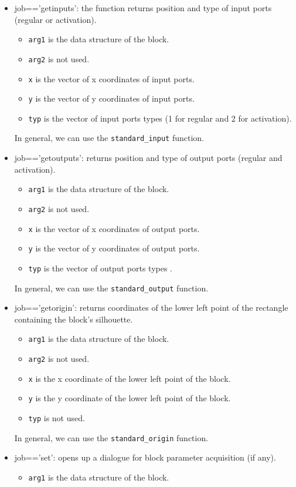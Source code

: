 \documentclass{article}
\begin{document}
\begin{itemize}
\item job=='getinputs': the function returns position and type of
  input ports (regular or activation). 
  \begin{itemize}
  \item  {\tt arg1} is the data structure of the block.
  \item  {\tt arg2} is not used.
  \item {\tt x} is the vector of x coordinates of input ports.
  \item {\tt y} is the vector of y coordinates of input ports.
  \item {\tt typ} is the vector of input ports types (1 for regular
and 2 for activation). 
  \end{itemize}
  In general, we can use the {\tt standard\_input} function.
\item job=='getoutputs': returns position and type of output ports
(regular and activation). 
  \begin{itemize}
  \item  {\tt arg1} is the data structure of the block. 
  \item  {\tt arg2} is not used.
  \item {\tt x} is the vector of x coordinates of output ports.
  \item {\tt y} is the vector of y coordinates of output ports.
  \item {\tt typ} is the vector of output ports types .
  \end{itemize}
In general, we can use the {\tt standard\_output} function.
\item job=='getorigin': returns coordinates of the lower
  left point of the rectangle containing the block's silhouette.
  \begin{itemize}
  \item  {\tt arg1} is the data structure of the block. 
  \item  {\tt arg2} is not used.
  \item {\tt x} is the x coordinate of the lower left point of the block.
  \item {\tt y} is the y coordinate of the lower left point of the block.
  \item {\tt typ} is not used.
  \end{itemize}
In general, we can use the {\tt standard\_origin} function.
\item job=='set': opens up a dialogue for block parameter acquisition
(if any).
  \begin{itemize}
  \item  {\tt arg1} is the data structure of the block. 

\end{itemize}
\end{itemize}
\end{document}
